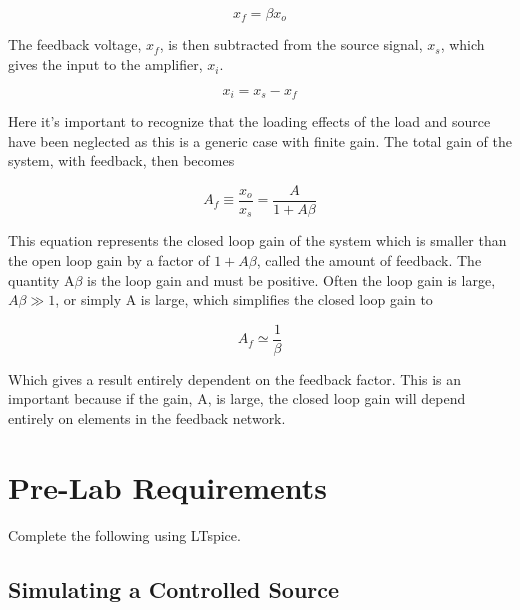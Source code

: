 \begin{equation}
	x_f = \beta x_o
\end{equation}

\noindent The feedback voltage, $x_f$, is then subtracted from the source signal, $x_s$, which gives the input to the amplifier, $x_i$. 

\begin{equation}
	x_i = x_s - x_f
\end{equation}

\noindent Here it's important to recognize that the loading effects of the load and source have been neglected as this is a generic case with finite gain. The total gain of the system, with feedback, then becomes

\begin{equation}
	A_f \equiv \frac{x_o}{x_s} = \frac{A}{1 + A \beta}
\end{equation}

\noindent This equation represents the closed loop gain of the system which is smaller than the open loop gain by a factor of $1+A\beta$, called the amount of feedback. The quantity A$\beta$ is the loop gain and must be positive. Often the loop gain is large, $A\beta \gg 1$, or simply A is large, which simplifies the closed loop gain to

\begin{equation}
	A_f \simeq \frac{1}{\beta}
\end{equation}

\noindent Which gives a result entirely dependent on the feedback factor. This is an important because if the gain, A, is large, the closed loop gain will depend entirely on elements in the feedback network. 

\section{Pre-Lab Requirements}

Complete the following using LTspice.

\subsection{Simulating a Controlled Source} \label{ssec:4simcs}

